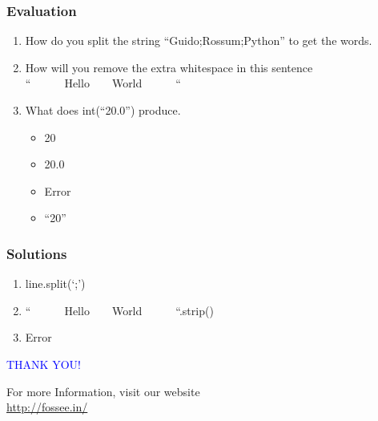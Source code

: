 \documentclass[presentation]{beamer}
\begin{document}
\begin{frame}
\frametitle{Evaluation}
\label{sec-10}


\begin{enumerate}
\item How do you split the string ``Guido;Rossum;Python'' to get the words.
\vspace{12pt}
\item How will you remove the extra whitespace in this sentence\\
     ``~~~~~~Hello~~~~World~~~~~~``
\vspace{12pt}     
\item What does int(``20.0'') produce.
\begin{itemize}
\item 20
\item 20.0
\item Error
\item ``20''
\end{itemize}
\end{enumerate}
\end{frame}
\begin{frame}
\frametitle{Solutions}
\label{sec-11}


\begin{enumerate}
\item line.split(`;')
\vspace{12pt}
\item ``~~~~~~Hello~~~~World~~~~~~``.strip()
\vspace{12pt}
\item Error
\end{enumerate}
\end{frame}
\begin{frame}

 \begin{block}{}
  \begin{center}
  \textcolor{blue}{\Large THANK YOU!} 
  \end{center}
  \end{block}
\begin{block}{}
  \begin{center}
    For more Information, visit our website\\
    \url{http://fossee.in/}
  \end{center}  
  \end{block}
\end{frame}
\end{document}
